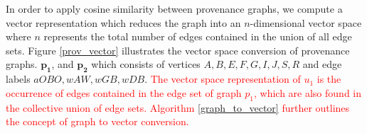 \par In order to apply cosine similarity between provenance graphs, we compute a vector representation which reduces the graph into an $n$-dimensional vector space where $n$ represents the total number of edges contained in the union of all edge sets. Figure \ref{prov_vector} illustrates the vector space conversion of provenance graphs. $\boldsymbol{p_1}$, and $\boldsymbol{p_2}$ which consists of vertices $A,B,E,F,G, I, J, S, R$ and edge labels $aOBO, wAW, wGB, wDB$. \textcolor{red}{The vector space representation of $u_1$ is the occurrence of edges contained in the edge set of graph $p_1$, which  are also found in the collective union of edge sets. Algorithm \ref{graph_to_vector} further outlines the concept of graph to vector conversion.}
%
%
%
%




